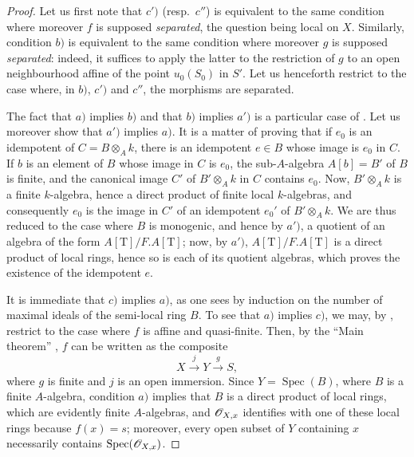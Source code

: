 \begin{proof}
Let us first note that $c')$ (resp.\ $c''$) is equivalent to the same condition where moreover $f$ is supposed \emph{separated}, the question being local on $X$.
Similarly, condition $b)$ is equivalent to the same condition where moreover $g$ is supposed \emph{separated}:
indeed, it suffices to apply the latter to the restriction of $g$ to an open neighbourhood affine of the point $u_0(S_0)$ in $S'$.
Let us henceforth restrict to the case where, in $b)$, $c')$ and $c''$, the morphisms are separated.

The fact that $a)$ implies $b)$ and that $b)$ implies $a')$ is a particular case of .
Let us moreover show that $a')$ implies $a)$.
It is a matter of proving that if $e_0$ is an idempotent of $C=B\otimes_A k$, there is an idempotent $e\in B$ whose image is $e_0$ in $C$.
If $b$ is an element of $B$ whose image in $C$ is $e_0$, the sub-$A$-algebra $A[b]=B'$ of $B$ is finite, and the canonical image $C'$ of $B'\otimes_A k$ in $C$ contains $e_0$.
Now, $B'\otimes_A k$ is a finite $k$-algebra, hence a direct product of finite local $k$-algebras, and consequently $e_0$ is the image in $C'$ of an idempotent $e_0'$ of $B'\otimes_A k$.
We are thus reduced to the case where $B$ is monogenic, and hence by $a')$, a quotient of an algebra of the form $A[\mathrm{T}]/F.A[\mathrm{T}]$;
now, by $a')$, $A[\mathrm{T}]/F.A[\mathrm{T}]$ is a direct product of local rings, hence so is each of its quotient algebras, which proves the existence of the idempotent $e$.

It is immediate that $c)$ implies $a)$, as one sees by induction on the number of maximal ideals of the semi-local ring $B$.
To see that $a)$ implies $c)$, we may, by , restrict to the case where $f$ is affine and quasi-finite.
Then, by the ``Main theorem'' , $f$ can be written as the composite
\[
X\xrightarrow{j}Y\xrightarrow{g}S,
\]
where $g$ is finite and $j$ is an open immersion.
Since $Y=\operatorname{Spec}(B)$, where $B$ is a finite $A$-algebra, condition $a)$ implies that $B$ is a direct product of local rings, which are evidently finite $A$-algebras, and $\mathscr{O}_{X,x}$ identifies with one of these local rings because $f(x)=s$;
moreover, every open subset of $Y$ containing $x$ necessarily contains $\operatorname{Spec}(\mathscr{O}_{X,x})$.


\end{proof}
